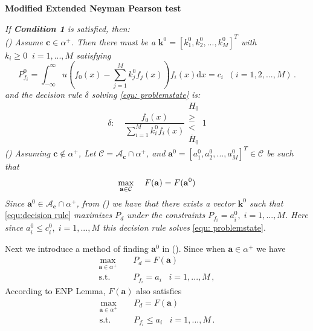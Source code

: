 \documentclass[12pt,journal,a4paper,twoside,onecolumn]{IEEEtran}
\newcommand{\rmnum}[1]{\romannumeral #1}
\begin{document}
\begin{spacing}{2.5}
\noindent \textbf{Modified Extended Neyman Pearson test}

\noindent \textit{
If \textnormal{\textbf{Condition 1}} is satisfied, then:
\\\textnormal{(\rmnum{1})} Assume $\mathbf{c} \in \alpha^+$. Then there must be a $\mathbf{k}^0 = [k_1^0, k_2^0, ..., k_M^0]^T$ with $k_i \geq 0\;\;i=1, ..., M$ satisfying
}
\begin{equation}
\label{equ:Pf}
  P_{f_i}^0 = \int_{-\infty}^{\infty} u(f_0(x) - \sum_{j=1}^{M}k_j^0f_j(x))f_i(x)\mathrm{d}x = c_i \;\; (i= 1, 2, ..., M)\,.
\end{equation}
\textit{
and the decision rule $\delta $ solving  \eqref{equ: problemstate} is:
}
\begin{equation}
\label{equ:decision rule}
\delta:\;\;\;\;\frac{f_0(x)}{\sum_{i=1}^{M}k_i^0f_i(x)} \substack{H_0 \\ \geq \\ < \\ \bar{H}_0} 1
\end{equation}
\textit{
\noindent \textnormal{(\rmnum{2})} Assuming $\mathbf{c} \notin \alpha^+$, Let $\mathcal{C} = \mathcal{A}_{\mathbf{c}} \cap \alpha^+$, and $\mathbf{a}^0 = [a_1^0, a_2^0, ..., a_M^0]^T \in \mathcal{C}$ be such that
}
\begin{equation}
\label{equ: F0}
\max_{\mathbf{a} \in \mathcal{C}}\;\;\;\;F(\mathbf{a}) = F(\mathbf{a}^0)\\
\end{equation}
\textit{
Since $\mathbf{a}^0 \in \mathcal{A}_{\mathbf{c}} \cap \alpha^+$, from \textnormal{(\rmnum{1})} we have that there exists a vector $\mathbf{k}^0$ such that}  \eqref{equ:decision rule} \textit{ maximizes $P_d$ under the constraints $P_{f_i} = a_i^0, \;i=1, ..., M$. Here since $a_i^0 \leq c_i^0, \;i=1, ..., M$ this decision rule  solves} \eqref{equ: problemstate}.

Next we introduce a method of finding $\mathbf{a}^0$ in (\rmnum{2}). 
Since when $\mathbf{a} \in \alpha^+$ we have 
\begin{equation}
  \begin{split}
    \underset{\mathbf{a} \in \alpha^+}{\max}\;\;\;\;&P_d = F(\mathbf{a})\\
    \text{s.t.}\;\;\;\;&P_{f_i} = a_i\;\;\;i=1, ..., M\,,
  \end{split}
\end{equation}
According to ENP Lemma, $F(\mathbf{a})$ also satisfies
\begin{equation}
  \begin{split}
  \label{equ: F}
        \underset{\mathbf{a} \in \alpha^+}{\max}\;\;\;\;&P_d = F(\mathbf{a})\\
    \text{s.t.}\;\;\;\;&P_{f_i} \leq a_i\;\;\;i=1, ..., M\,.
  \end{split}
\end{equation}


\end{spacing}
\end{document}
